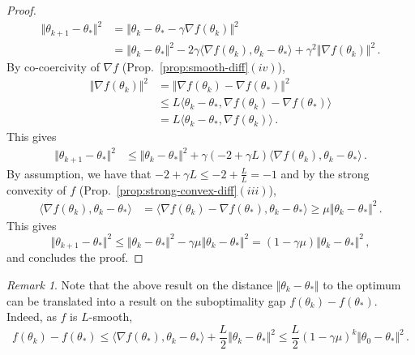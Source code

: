 \documentclass[11pt,reqno]{article}
\renewcommand{\leq}{\leqslant}
\renewcommand{\geq}{\geqslant}
\numberwithin{equation}{section}
\theoremstyle{plain}
\theoremstyle{definition}
\theoremstyle{remark}
\newtheorem{remark}[assumption]{Remark}
\begin{document}
\begin{proof}
	\begin{align*}
		\Vert \theta_{k+1} - \theta_* \Vert^2 &= \Vert \theta_k - \theta_* - \gamma \nabla f(\theta_k) \Vert^2 \\
		&= \Vert \theta_k - \theta_* \Vert^2 - 2 \gamma \langle \nabla f(\theta_k), \theta_k - \theta_* \rangle + \gamma^2 \Vert \nabla f(\theta_k) \Vert^2 \, .
	\end{align*}
	By co-coercivity of $\nabla f$ (Prop.~\ref{prop:smooth-diff}$(iv)$),
	\begin{align*}
		\Vert \nabla f(\theta_k) \Vert^2 &= \Vert \nabla f(\theta_k) - \nabla f(\theta_*) \Vert^2 \\
		&\leq L \langle \theta_k - \theta_*, \nabla f(\theta_k) - \nabla f(\theta_*) \rangle\\
		&= L \langle \theta_k - \theta_*, \nabla f(\theta_k) \rangle \, .
	\end{align*}
	This gives 
	\begin{align*}
		\Vert \theta_{k+1} - \theta_* \Vert^2 
		&\leq \Vert \theta_k - \theta_* \Vert^2 +\gamma (-2+\gamma L) \langle \nabla f(\theta_k), \theta_k - \theta_* \rangle \, .
	\end{align*}
	By assumption, we have that $-2+\gamma L \leq -2 + \frac{L}{L} = -1$ and by the strong convexity of $f$ (Prop.~\ref{prop:strong-convex-diff}$(iii)$), 
	\begin{align*}
		\langle \nabla f(\theta_k), \theta_k - \theta_* \rangle &= \langle \nabla f(\theta_k) - \nabla f(\theta_*), \theta_k - \theta_* \rangle \geq \mu \Vert \theta_k - \theta_* \Vert^2 \, .
	\end{align*}
	This gives 
	\begin{equation*}
		\Vert \theta_{k+1} - \theta_* \Vert^2 \leq \Vert \theta_k - \theta_* \Vert^2 - \gamma \mu \Vert \theta_k - \theta_* \Vert^2 = (1-\gamma \mu) \Vert \theta_k - \theta_* \Vert^2 \, ,
	\end{equation*}
	and concludes the proof. 
\end{proof}

\begin{remark}
	Note that the above result on the distance $\Vert \theta_k - \theta_* \Vert$ to the optimum can be translated into a result on the suboptimality gap $f(\theta_k) - f(\theta_*)$. Indeed, as $f$ is $L$-smooth, 
	\begin{equation*}
		f(\theta_k) - f(\theta_*) \leq \langle \nabla f(\theta_*), \theta_k - \theta_* \rangle + \frac{L}{2} \Vert \theta_k - \theta_* \Vert^2 \leq \frac{L}{2} (1-\gamma \mu)^k \Vert \theta_0 - \theta_* \Vert^2 \, .
	\end{equation*}
\end{remark}
\end{document}
